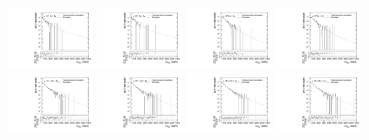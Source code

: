 \begin{figure}[htbp]
  \centering
  \includegraphics[width=0.2\textwidth]{fig/2Dfit/templateVsReco_res_r0_MVV_mu_HP_bb_LDy.pdf}
  \includegraphics[width=0.2\textwidth]{fig/2Dfit/templateVsReco_res_r0_MVV_e_HP_bb_LDy.pdf}
  \includegraphics[width=0.2\textwidth]{fig/2Dfit/templateVsReco_res_r0_MVV_mu_LP_bb_LDy.pdf}
  \includegraphics[width=0.2\textwidth]{fig/2Dfit/templateVsReco_res_r0_MVV_e_LP_bb_LDy.pdf}\\
  \includegraphics[width=0.2\textwidth]{fig/2Dfit/templateVsReco_res_r0_MVV_mu_HP_nobb_LDy.pdf}
  \includegraphics[width=0.2\textwidth]{fig/2Dfit/templateVsReco_res_r0_MVV_e_HP_nobb_LDy.pdf}
  \includegraphics[width=0.2\textwidth]{fig/2Dfit/templateVsReco_res_r0_MVV_mu_LP_nobb_LDy.pdf}
  \includegraphics[width=0.2\textwidth]{fig/2Dfit/templateVsReco_res_r0_MVV_e_LP_nobb_LDy.pdf}\\

\end{figure}
